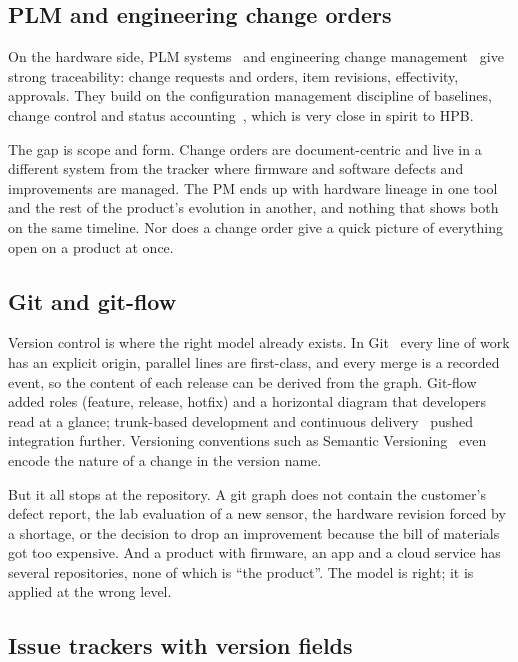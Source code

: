 \subsection{PLM and engineering change orders}
\label{sec:gaps-plm}

On the hardware side, PLM systems~\citep{stark2015plm} and engineering
change management~\citep{jarratt2011ec} give strong traceability: change
requests and orders, item revisions, effectivity, approvals. They build on
the configuration management discipline of
baselines, change control and status
accounting~\citep{ieee828,iso10007}, which is very close in spirit to HPB.

The gap is scope and form. Change orders are document-centric and live in
a different system from the tracker where firmware and software defects and
improvements are managed. The PM ends up with hardware lineage in one tool
and the rest of the product's evolution in another, and nothing that shows
both on the same timeline. Nor does a change order give a quick picture of
everything open on a product at once.

\subsection{Git and git-flow}
\label{sec:gaps-git}

Version control is where the right model already exists. In
Git~\citep{chacon2014progit} every line of work has an explicit origin,
parallel lines are first-class, and every merge is a recorded event, so the
content of each release can be derived from the graph. Git-flow~\citep{driessen2010gitflow}
added roles (feature, release, hotfix) and a horizontal diagram that
developers read at a glance; trunk-based development and continuous
delivery~\citep{humble2010cd} pushed integration further. Versioning
conventions such as Semantic Versioning~\citep{semver} even encode the
nature of a change in the version name.

But it all stops at the repository. A git graph does not contain the
customer's defect report, the lab evaluation of a new sensor, the
hardware revision forced by a shortage, or the decision to drop an
improvement because the bill of materials got too expensive. And a product
with firmware, an app and a cloud service has several repositories, none of
which is ``the product''. The model is right; it is applied at the wrong
level.

\subsection{Issue trackers with version fields}
\label{sec:gaps-trackers}

